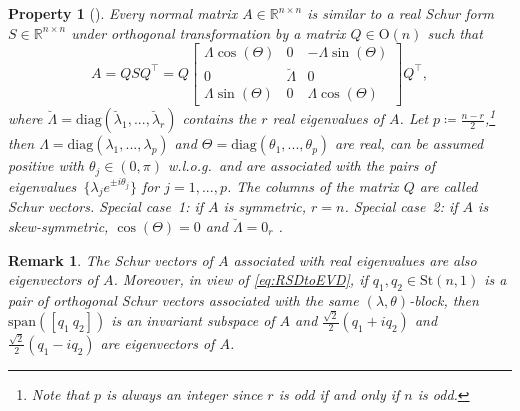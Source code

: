 \documentclass[10pt,twoside,dvipsnames]{siamart1116}
\numberwithin{algorithm}{section}
\newtheorem{property}[theorem]{Property}
\newtheorem{remark}[theorem]{Remark}
\numberwithin{equation}{section}
\begin{document}
\begin{property}[{\cite[Thm~2.5.8]{horn13}}]\label{property:schur}
Every normal matrix $A\in\mathbb{R}^{n\times n}$ is similar to a real Schur form $S\in\mathbb{R}^{n\times n}$ under orthogonal  transformation by a matrix $Q\in\mathrm{O}(n)$ such that
	\begin{equation}\label{eq:schur_form}
		A = Q S Q^\top  = Q \begin{bmatrix}
	\Lambda\cos(\Theta)&0&-\Lambda\sin(\Theta)\\
	0&\breve{\Lambda}&0\\
	 \Lambda\sin(\Theta)&0&\Lambda\cos(\Theta)
	\end{bmatrix}Q^\top ,
	\end{equation} where $\breve{\Lambda}=\mathrm{diag}(\breve{\lambda}_1,...,\breve{\lambda}_r)$ contains the $r$ real eigenvalues of $A$. Let $p\coloneq\frac{n-r}{2}$,\footnote{Note that $p$ is always an integer since $r$ is odd if and only if $n$ is odd.} then $\Lambda=\mathrm{diag}(\lambda_1,...,\lambda_p)$ and $\Theta=\mathrm{diag}(\theta_1,...,\theta_p)$ are real, can be assumed positive with $\theta_j\in(0,\pi)$ w.l.o.g.~and are associated with the pairs of eigenvalues~$\{\lambda_j e^{\pm i\theta_j}\}$ for $j=1,...,p$. The columns of the matrix $Q$ are called \emph{Schur vectors}.
	Special case~1: if $A$ is symmetric, $r=n$.
	Special case~2: if $A$ is skew-symmetric, $\cos(\Theta)=0$ and $\breve{\Lambda}=0_r$ \cite[Cor.~2.5.11]{horn13}.
\end{property}
 \begin{remark}
\emph{The Schur vectors of $A$ associated with real eigenvalues are also eigenvectors of $A$. Moreover, in view of \eqref{eq:RSDtoEVD}, if $q_1,q_2\in\mathrm{St}(n,1)$ is a pair of orthogonal Schur vectors associated with the same $(\lambda,\theta)$-block, then $\mathrm{span}([q_1\ q_2])$ is an invariant subspace of $A$ and $\frac{\sqrt{2}}{2}(q_1+iq_2)$ and $\frac{\sqrt{2}}{2}(q_1-iq_2)$ are eigenvectors of $A$.}
 \end{remark}
\end{document}
